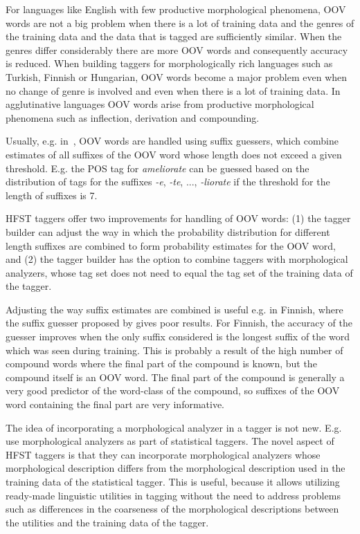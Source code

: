 \documentclass{llncs}
\begin{document}
For languages like English with few productive morphological
phenomena, OOV words are not a big problem when there is a lot of
training data and the genres of the training data and the data that is
tagged are sufficiently similar. When the genres differ considerably
there are more OOV words and consequently accuracy is reduced. When
building taggers for morphologically rich languages such as Turkish,
Finnish or Hungarian, OOV words become a major problem even when no
change of genre is involved and even when there is a lot of training
data. In agglutinative languages OOV words arise from productive
morphological phenomena such as inflection, derivation and
compounding.

Usually, e.g. in~\cite{Brants:2000}, OOV words are handled using
suffix guessers, which combine estimates of all suffixes of the OOV
word whose length does not exceed a given threshold. E.g. the POS tag
for {\it ameliorate} can be guessed based on the distribution of tags
for the suffixes {\it -e}, {\it -te}, ..., {\it -liorate} if the
threshold for the length of suffixes is 7.

HFST taggers offer two improvements for handling of OOV words: (1) the
tagger builder can adjust the way in which the probability
distribution for different length suffixes are combined to form
probability estimates for the OOV word, and (2) the tagger builder has
the option to combine taggers with morphological analyzers, whose tag
set does not need to equal the tag set of the training data of
the tagger.

Adjusting the way suffix estimates are combined is useful e.g. in
Finnish, where the suffix guesser proposed by \cite{Brants:2000} gives
poor results. For Finnish, the accuracy of the guesser improves when
the only suffix considered is the longest suffix of the word which was
seen during training. This is probably a result of the high number of
compound words where the final part of the compound is known, but the
compound itself is an OOV word. The final part of the compound is
generally a very good predictor of the word-class of the compound, so
suffixes of the OOV word containing the final part are very
informative.

The idea of incorporating a morphological analyzer in a tagger is not
new. E.g.  \cite{Tzoukerman:1996,Oravecz:2002} use morphological
analyzers as part of statistical taggers. The novel aspect of HFST
taggers is that they can incorporate morphological analyzers whose
morphological description differs from the morphological description
used in the training data of the statistical tagger. This is useful,
because it allows utilizing ready-made linguistic utilities in tagging
without the need to address problems such as differences in the
coarseness of the morphological descriptions between the utilities and
the training data of the tagger.
\end{document}
